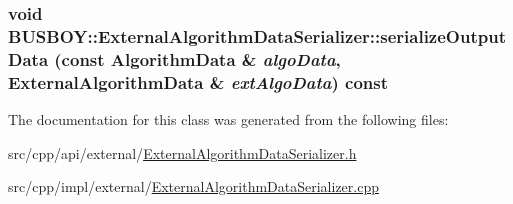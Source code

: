 \label{classBUSBOY_1_1ExternalAlgorithmDataSerializer_a382032041e694cb53c8fe03c5c8dff80}
\hypertarget{classBUSBOY_1_1ExternalAlgorithmDataSerializer_adcae85dc71d98643e0874935b432c1ce}{
\subsubsection[{serializeOutputData}]{\setlength{\rightskip}{0pt plus 5cm}void BUSBOY::ExternalAlgorithmDataSerializer::serializeOutputData (const {\bf AlgorithmData} \& {\em algoData}, \/  {\bf ExternalAlgorithmData} \& {\em extAlgoData}) const}}
\label{classBUSBOY_1_1ExternalAlgorithmDataSerializer_adcae85dc71d98643e0874935b432c1ce}


The documentation for this class was generated from the following files:\begin{DoxyCompactItemize}
\item 
src/cpp/api/external/\hyperlink{ExternalAlgorithmDataSerializer_8h}{ExternalAlgorithmDataSerializer.h}\item 
src/cpp/impl/external/\hyperlink{ExternalAlgorithmDataSerializer_8cpp}{ExternalAlgorithmDataSerializer.cpp}\end{DoxyCompactItemize}
